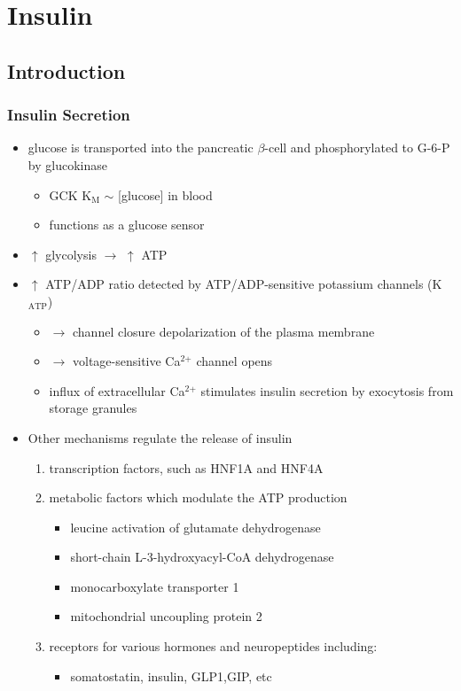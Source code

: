 \documentclass{scrartcl}
\begin{document}
\section{Insulin}
\label{sec:org46b7ea5}
\subsection{Introduction}
\label{sec:org598bf76}
\subsubsection{Insulin Secretion}
\label{sec:org3d91e44}
\begin{itemize}
\item glucose is transported into the pancreatic \(\beta\)-cell and phosphorylated to G-6-P by glucokinase
\begin{itemize}
\item GCK K\(_{\text{M}}\) \(\sim\) [glucose] in blood
\item functions as a glucose sensor
\end{itemize}
\item \(\uparrow\) glycolysis \(\to\) \(\uparrow\) ATP
\item \(\uparrow\) ATP/ADP ratio detected by ATP/ADP-sensitive potassium channels (K\(_{\text{ATP}}\))
\begin{itemize}
\item \(\to\) channel closure depolarization of the plasma membrane
\item \(\to\) voltage-sensitive Ca\(^{\text{2+}}\) channel opens
\item influx of extracellular Ca\(^{\text{2+}}\) stimulates insulin secretion by
exocytosis from storage granules
\end{itemize}

\item Other mechanisms regulate the release of insulin
\begin{enumerate}
\item transcription factors, such as HNF1A and HNF4A
\item metabolic factors which modulate the ATP production
\begin{itemize}
\item leucine activation of glutamate dehydrogenase
\item short-chain L-3-hydroxyacyl-CoA dehydrogenase
\item monocarboxylate transporter 1
\item mitochondrial uncoupling protein 2
\end{itemize}
\item receptors for various hormones and neuropeptides including:
\begin{itemize}
\item somatostatin, insulin, GLP1,GIP, etc
\end{itemize}
\end{enumerate}
\end{itemize}
\end{document}
